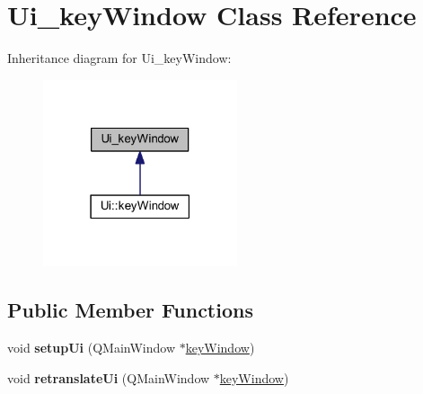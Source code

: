 \hypertarget{class_ui__key_window}{}\section{Ui\+\_\+key\+Window Class Reference}
\label{class_ui__key_window}


Inheritance diagram for Ui\+\_\+key\+Window\+:
\nopagebreak
\begin{figure}[H]
\begin{center}
\leavevmode
\includegraphics[width=162pt]{class_ui__key_window__inherit__graph}
\end{center}
\end{figure}
\subsection*{Public Member Functions}
\begin{DoxyCompactItemize}
\item 
\mbox{\label{class_ui__key_window_a965666f5814975fb0a1e009fa617db9c}} 
void {\bfseries setup\+Ui} (Q\+Main\+Window $\ast$\hyperlink{classkey_window}{key\+Window})
\item 
\mbox{\label{class_ui__key_window_a10405e1fa67fc41cb67c383b2632f7f3}} 
void {\bfseries retranslate\+Ui} (Q\+Main\+Window $\ast$\hyperlink{classkey_window}{key\+Window})
\end{DoxyCompactItemize}
